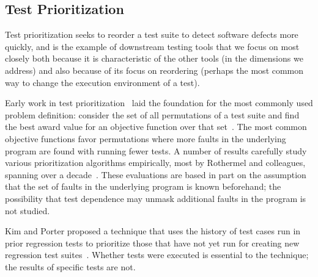 \subsection{Test Prioritization}



Test prioritization seeks to reorder a test suite to detect
software defects more quickly, and is the example of downstream
testing tools that we focus on most closely both because it is
characteristic of the other tools (in the dimensions we address)
and also because of its focus on reordering (perhaps the most common
way to change the execution environment of a test).

Early work in test
prioritization~\cite{Wong:1997:SER:851010.856115,Rothermel:1999:TCP:519621.853398}
laid the foundation for the most commonly used problem definition:
consider the set of all permutations of a test suite and find the best
award value for an objective function over that
set~\cite{Elbaum:2000:PTC:347324.348910}.  The most common objective
functions favor permutations where more faults in the underlying
program  are found with running fewer tests.
A number of results carefully study various prioritization algorithms
empirically, most by Rothermel and colleagues,
spanning over a decade~\cite[\emph{et
alia}]{Rothermel:1999:TCP:519621.853398,Do:2010:ETC:1907658.1908088}.  These evaluations are based in part on the assumption that the set of faults in the underlying program is known beforehand; the possibility that test dependence may unmask additional faults in the program is not studied.

Kim and Porter proposed a 
technique that uses the history of test cases run in prior
regression tests to prioritize those that have not yet run for
creating new 
regression test suites~\cite{Kim:2002:HTP:581339.581357}.  Whether
tests were executed is essential to the technique; the results
of specific tests are not.

